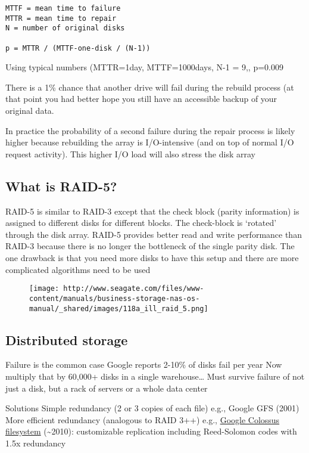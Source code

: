 \begin{verbatim}
MTTF = mean time to failure
MTTR = mean time to repair
N = number of original disks

p = MTTR / (MTTF-one-disk / (N-1))
\end{verbatim}

Using typical numbers (MTTR=1day, MTTF=1000days, N-1 = 9,, p=0.009

There is a 1\% chance that another drive will fail during the rebuild
process (at that point you had better hope you still have an accessible
backup of your original data.

In practice the probability of a second failure during the repair
process is likely higher because rebuilding the array is I/O-intensive
(and on top of normal I/O request activity). This higher I/O load will
also stress the disk array

\subsection{What is RAID-5?}\label{what-is-raid-5}

RAID-5 is similar to RAID-3 except that the check block (parity
information) is assigned to different disks for different blocks. The
check-block is `rotated' through the disk array. RAID-5 provides better
read and write performance than RAID-3 because there is no longer the
bottleneck of the single parity disk. The one drawback is that you need
more disks to have this setup and there are more complicated algorithms
need to be used

\begin{figure}[htbp]
\centering
\texttt{[image: http://www.seagate.com/files/www-content/manuals/business-storage-nas-os-manual/\_shared/images/118a\_ill\_raid\_5.png]}
\caption{}
\end{figure}

\subsection{Distributed storage}\label{distributed-storage}

Failure is the common case Google reports 2-10\% of disks fail per year
Now multiply that by 60,000+ disks in a single warehouse\ldots{} Must
survive failure of not just a disk, but a rack of servers or a whole
data center

Solutions Simple redundancy (2 or 3 copies of each file) e.g., Google
GFS (2001) More efficient redundancy (analogous to RAID 3++) e.g.,
\href{http://goo.gl/LwFIy}{Google Colossus filesystem}
(\textasciitilde{}2010): customizable replication including Reed-Solomon
codes with 1.5x redundancy


